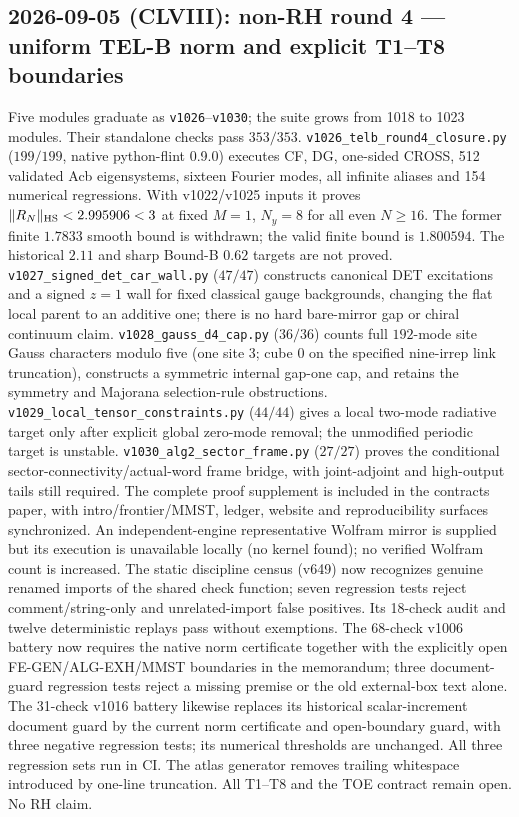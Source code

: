 \documentclass[11pt]{article}
\begin{document}
\subsection*{2026-09-05 (CLVIII): non-RH round 4 --- uniform TEL-B norm and explicit T1--T8 boundaries}
Five modules graduate as \texttt{v1026}--\texttt{v1030}; the suite grows
from 1018 to 1023 modules. Their standalone checks pass $353/353$.
\texttt{v1026\_\allowbreak telb\_\allowbreak round4\_\allowbreak closure.py}
($199/199$, native python-flint 0.9.0) executes CF, DG, one-sided CROSS,
512 validated Acb eigensystems, sixteen Fourier modes, all infinite aliases
and 154 numerical regressions. With v1022/v1025 inputs it proves
$\|R_N\|_{\rm HS}<2.995906<3$ at fixed $M=1$, $N_y=8$ for all even $N\ge16$. The former finite
$1.7833$ smooth bound is withdrawn; the valid finite bound is $1.800594$.
The historical $2.11$ and sharp Bound-B $0.62$ targets are not proved.
\texttt{v1027\_\allowbreak signed\_\allowbreak det\_\allowbreak car\_\allowbreak wall.py}
($47/47$) constructs canonical DET excitations and a signed $z=1$ wall
for fixed classical gauge backgrounds, changing the flat local parent
to an additive one; there is no hard bare-mirror gap or chiral continuum claim.
\texttt{v1028\_\allowbreak gauss\_\allowbreak d4\_\allowbreak cap.py}
($36/36$) counts full $192$-mode site Gauss characters modulo five
(one site 3; cube 0 on the specified nine-irrep link truncation),
constructs a symmetric internal gap-one cap, and retains the symmetry
and Majorana selection-rule obstructions.
\texttt{v1029\_\allowbreak local\_\allowbreak tensor\_\allowbreak constraints.py}
($44/44$) gives a local two-mode radiative target only after explicit
global zero-mode removal; the unmodified periodic target is unstable.
\texttt{v1030\_\allowbreak alg2\_\allowbreak sector\_\allowbreak frame.py}
($27/27$) proves the conditional sector-connectivity/actual-word frame
bridge, with joint-adjoint and high-output tails still required.
The complete proof supplement is included in the contracts paper, with
intro/frontier/MMST, ledger, website and reproducibility surfaces synchronized.
An independent-engine representative Wolfram mirror is supplied but its
execution is unavailable locally (no kernel found); no verified Wolfram
count is increased. The static discipline census (v649) now recognizes
genuine renamed imports of the shared check function; seven regression tests
reject comment/string-only and unrelated-import false positives. Its
18-check audit and twelve deterministic replays pass without exemptions.
The 68-check v1006 battery now requires the native norm certificate together
with the explicitly open FE-GEN/ALG-EXH/MMST boundaries in the memorandum;
three document-guard regression tests reject a missing premise or the old
external-box text alone. The 31-check v1016 battery likewise replaces its
historical scalar-increment document guard by the current norm certificate
and open-boundary guard, with three negative regression tests; its numerical
thresholds are unchanged. All three regression sets run in CI. The atlas
generator removes trailing whitespace introduced by one-line truncation.
All T1--T8 and the TOE contract remain open. No RH claim.
\end{document}
